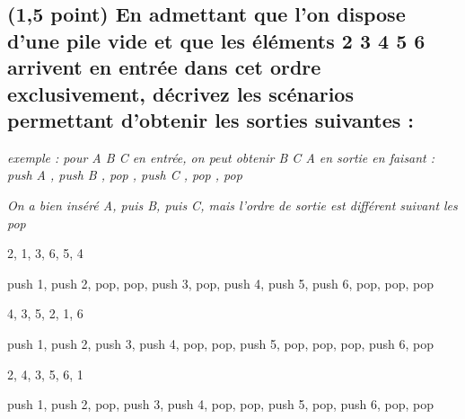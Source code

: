 \documentclass[11pt,a4paper]{article}
\begin{document}
\bigskip
\bigskip



\vfillLast

\clearpage

\subsection{(1,5 point) En admettant que l'on dispose d'une pile vide et que les éléments  2 3 4 5 6 \fg{} arrivent en entrée dans cet ordre exclusivement, décrivez les scénarios permettant d'obtenir les sorties suivantes : }


\medskip

\begin{center}
\noindent \textit{exemple : pour \og A B C \fg{} en entrée, on peut obtenir \og B C A \fg{} en sortie en faisant : \linebreak
\og push A \fg, \og push B \fg, \og pop \fg, \og push C \fg, \og pop \fg, \og pop \fg }

\noindent \textit{On a bien inséré A, puis B, puis C, mais l'ordre de sortie est différent suivant les \og pop \fg}
\end{center}

\medskip



\begin{center}

\begin{large}
2, 1, 3, 6, 5, 4
\end{large}

\begin{center}
 push 1, push 2, pop, pop, push 3, pop, push 4, push 5, push 6, pop, pop, pop
\end{center}


\begin{large}
4, 3, 5, 2, 1, 6
\end{large}

\begin{center}
 push 1, push 2, push 3, push 4, pop, pop, push 5, pop, pop, pop, push 6, pop
\end{center}


\begin{large}
2, 4, 3, 5, 6, 1
\end{large}

\begin{center}
 push 1, push 2, pop, push 3, push 4, pop, pop, push 5, pop, push 6, pop, pop
\end{center}

\end{center}
\end{document}
